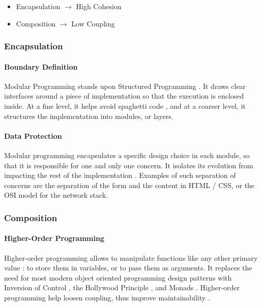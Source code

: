 \begin{itemize}
\item Encapsulation $\to$ High Cohesion
\item Composition $\to$ Low Coupling
\end{itemize}

\subsubsection{Encapsulation}

\paragraph{Boundary Definition}
%
Modular Programming stands upon Structured Programming \cite{Dijkstra1970}.
It draws clear interfaces around a piece of implementation so that the execution is enclosed inside.
At a fine level, it helps avoid spaghetti code \cite{Dijkstra1968a}, and at a coarser level, it structures the implementation \cite{Dijkstra1968} into modules, or layers.

\paragraph{Data Protection}
%
Modular programming encapsulates a specific design choice in each module, so that it is responsible for one and only one concern.
It isolates its evolution from impacting the rest of the implementation \cite{Parnas1972, Tarr1999, Hursch1995}.
Examples of such separation of concerns are the separation of the form and the content in HTML / CSS, or the OSI model for the network stack.

\subsubsection{Composition} \label{chapter3:software-maintainability:modularity:features}

\paragraph{Higher-Order Programming}
Higher-order programming allows to manipulate functions like any other primary value : to store them in variables, or to pass them as arguments.
It replaces the need for most modern object oriented programming design patterns  with Inversion of Control \cite{Johnson}, the Hollywood Principle \cite{Sweet1985}, and Monads \cite{Wadler1992}.
Higher-order programming help loosen coupling, thus improve maintainability \cite{Haynes1984}.

